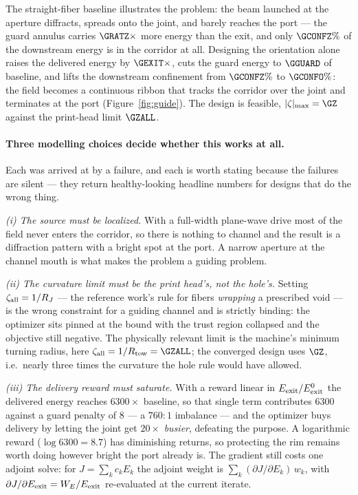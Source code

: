 \documentclass[11pt]{article}
\begin{document}
The straight-fiber baseline illustrates the problem: the beam launched at the
aperture diffracts, spreads onto the joint, and barely reaches the port --- the
guard annulus carries $\GRATZ\times$ more energy than the exit, and only
$\GCONFZ\%$ of the downstream energy is in the corridor at all. Designing the
orientation alone raises the delivered energy by $\GEXIT\times$, cuts the guard
energy to $\GGUARD$ of baseline, and lifts the downstream confinement from
$\GCONFZ\%$ to $\mathbf{\GCONFO\%}$: the field becomes a continuous ribbon that
tracks the corridor over the joint and terminates at the port
(Figure~\ref{fig:guide}). The design is feasible, $|\zeta|_{\max}=\GZ$ against the
print-head limit $\GZALL$.

\paragraph{Three modelling choices decide whether this works at all.} Each was
arrived at by a failure, and each is worth stating because the failures are silent
--- they return healthy-looking headline numbers for designs that do the wrong
thing.

\emph{(i) The source must be localized.} With a full-width plane-wave drive most
of the field never enters the corridor, so there is nothing to channel and the
result is a diffraction pattern with a bright spot at the port. A narrow aperture
at the channel mouth is what makes the problem a guiding problem.

\emph{(ii) The curvature limit must be the print head's, not the hole's.} Setting
$\zeta_{\rm all}=1/R_J$ --- the reference work's rule for fibers \emph{wrapping} a
prescribed void --- is the wrong constraint for a guiding channel and is strictly
binding: the optimizer sits pinned at the bound with the trust region collapsed
and the objective still negative. The physically relevant limit is the machine's
minimum turning radius, here $\zeta_{\rm all}=1/R_{\rm tow}=\GZALL$; the converged
design uses $\GZ$, i.e.\ nearly three times the curvature the hole rule would have
allowed.

\emph{(iii) The delivery reward must saturate.} With a reward linear in
$E_{\rm exit}/E_{\rm exit}^0$ the delivered energy reaches $6300\times$ baseline,
so that single term contributes $6300$ against a guard penalty of $8$ --- a
$760\!:\!1$ imbalance --- and the optimizer buys delivery by letting the joint get
$20\times$ \emph{busier}, defeating the purpose. A logarithmic reward
($\log 6300=8.7$) has diminishing returns, so protecting the rim remains worth
doing however bright the port already is. The gradient still costs one adjoint
solve: for $J=\sum_k c_k E_k$ the adjoint weight is $\sum_k(\partial J/\partial
E_k)\,w_k$, with $\partial J/\partial E_{\rm exit}=W_E/E_{\rm exit}$ re-evaluated
at the current iterate.
\end{document}
